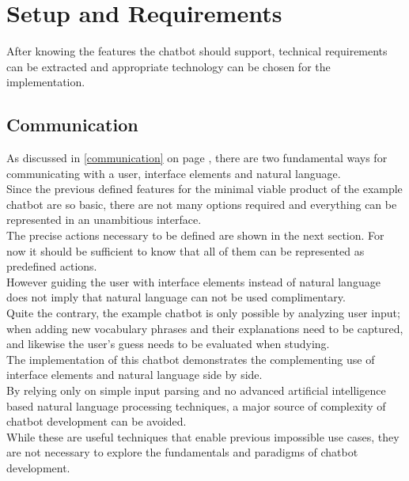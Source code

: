 \section{Setup and Requirements}

After knowing the features the chatbot should support,
technical requirements can be extracted
and appropriate technology can be chosen for the implementation.


\subsection{Communication}

As discussed in \ref{communication} on page \pageref{communication},
there are two fundamental ways for communicating with a user,
interface elements and natural language.
\\

Since the previous defined features for the minimal viable product of the example chatbot are so basic,
there are not many options required and everything can be represented in an unambitious interface.
\\

The precise actions necessary to be defined are shown in the next section.
For now it should be sufficient to know that all of them can be represented as predefined actions.
\\
However guiding the user with interface elements instead of natural language
does not imply that natural language can not be used complimentary.
\\
Quite the contrary, the example chatbot is only possible by analyzing user input;
when adding new vocabulary phrases and their explanations need to be captured,
and likewise the user's guess needs to be evaluated when studying.
\\

The implementation of this chatbot demonstrates the complementing use of interface elements and natural language side by side.
\\

By relying only on simple input parsing and no advanced artificial intelligence based natural language processing techniques,
a major source of complexity of chatbot development can be avoided.
\\
While these are useful techniques that enable previous impossible use cases,
they are not necessary to explore the fundamentals and paradigms of chatbot development.
\\

